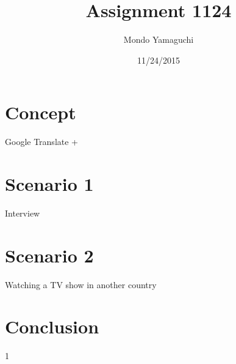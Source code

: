 \documentclass{article}
\title{Assignment 1124}
\author{Mondo Yamaguchi}
\date{11/24/2015}
\begin{document}
\maketitle


\section{Concept}
Google Translate + 
\label{Concept}


\section{Scenario 1}
\label{Scenario 1}
Interview 

\section{Scenario 2}
\label{Scenario 2}
Watching a TV show in another country

\section{Conclusion}


\pagebreak

\begin{thebibliography} {1}

\end{thebibliography}
\end{document}
